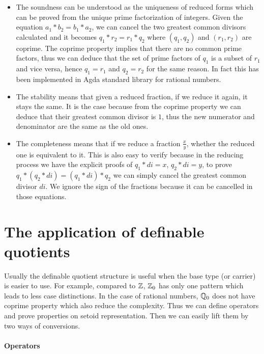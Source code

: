 \begin{itemize}
\item The soundness can be understood as the uniqueness of reduced forms which can be proved from the unique prime factorization of integers. Given the equation $a_1 * b_2 = b_1 * a_2$, we can cancel the two greatest common divisors calculated and it becomes $q_1 * r_2 = r_1 * q_2$ where $(q_1,q_2)$ and $(r_1,r_2)$ are coprime.  The coprime property implies that there are no common prime factors, thus we can deduce that the set of prime factors of $q_1$ is a subset of $r_1$ and vice versa, hence $q_1 = r_1$ and $q_2 = r_2$ for the same reason. In fact this has been implemented in Agda standard library for rational numbers.

\item The stability means that given a reduced fraction, if we reduce it again, it stays the same. It is the case because from the coprime property we can deduce that their greatest common divisor is $1$, thus the new numerator and denominator are the same as the old ones.

\item The completeness means that if we reduce a fraction $\frac{x}{y}$, whether the reduced one is equivalent to it. This is also easy to verify because in the reducing process we have the explicit proofs of $q_1*di=x$, $q_2*di=y$, to prove $q_1 * (q_2 * di) = (q_1 *di) * q_2$ we can simply cancel the greatest common divisor $di$. We ignore the sign of the fractions because it can be cancelled in those equations.
\end{itemize}


\section{The application of definable quotients}

Usually the definable quotient structure is useful when the base type (or carrier) is easier to use.  For example, compared to $\mathbb{Z}$, $\mathbb{Z}_0$ has only one pattern which leads to less case distinctions.
In  the case of rational numbers, $\mathbb{Q}_0$ does not have coprime property which also reduce the complexity.
Thus we can define operators and prove properties on setoid representation. Then we can easily lift them by two ways of conversions.

\paragraph{Operators}

